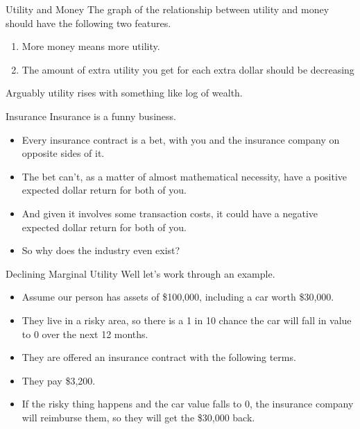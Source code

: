 \documentclass[
  ignorenonframetext,
]{beamer}
\providecommand{\tightlist}{%
  \setlength{\itemsep}{0pt}\setlength{\parskip}{0pt}}
\begin{document}
\begin{frame}{Utility and Money}
\protect\hypertarget{utility-and-money}{}
The graph of the relationship between utility and money should have the
following two features.

\begin{enumerate}
\tightlist
\item
  More money means more utility.
\item
  The amount of extra utility you get for each extra dollar should be
  decreasing
\end{enumerate}

Arguably utility rises with something like log of wealth.
\end{frame}

\begin{frame}{Insurance}
\protect\hypertarget{insurance}{}
Insurance is a funny business.

\begin{itemize}
\tightlist
\item
  Every insurance contract is a bet, with you and the insurance company
  on opposite sides of it.
\item
  The bet can't, as a matter of almost mathematical necessity, have a
  positive expected dollar return for both of you.
\item
  And given it involves some transaction costs, it could have a negative
  expected dollar return for both of you.
\item
  So why does the industry even exist?
\end{itemize}
\end{frame}

\begin{frame}{Declining Marginal Utility}
\protect\hypertarget{declining-marginal-utility}{}
Well let's work through an example.

\begin{itemize}
\tightlist
\item
  Assume our person has assets of \$100,000, including a car worth
  \$30,000.
\item
  They live in a risky area, so there is a 1 in 10 chance the car will
  fall in value to 0 over the next 12 months.
\item
  They are offered an insurance contract with the following terms.
\item
  They pay \$3,200.
\item
  If the risky thing happens and the car value falls to 0, the insurance
  company will reimburse them, so they will get the \$30,000 back.
\end{itemize}
\end{frame}
\end{document}

